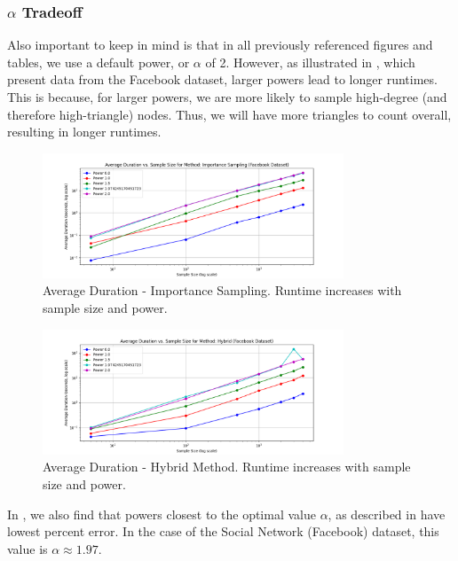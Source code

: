 \documentclass[11pt, margin=1in]{article}
\begin{document}
\subsubsection{$\alpha$ Tradeoff}

Also important to keep in mind is that in all previously referenced figures and tables, we use a default power, or $\alpha$ of 2.
However, as illustrated in , which present data from the Facebook dataset, larger powers lead to longer runtimes.
This is because, for larger powers, we are more likely to sample high-degree (and therefore high-triangle) nodes.
Thus, we will have more triangles to count overall, resulting in longer runtimes.

\begin{figure}[H]
    \centering
    \includegraphics[width=0.8\textwidth]{plots/durations/avg_duration_Importance Sampling.png}
    \caption{Average Duration - Importance Sampling. Runtime increases with sample size and power.}
    \label{fig:avg_duration_importance}
\end{figure}

\begin{figure}[H]
    \centering
    \includegraphics[width=0.8\textwidth]{plots/durations/avg_duration_Hybrid.png}
    \caption{Average Duration - Hybrid Method. Runtime increases with sample size and power.}
    \label{fig:avg_duration_variance_importance}
\end{figure}

In , we also find that powers closest to the optimal value $\alpha$, as described in  have lowest percent error.
In the case of the Social Network (Facebook) dataset, this value is $\alpha \approx 1.97$.
\end{document}
